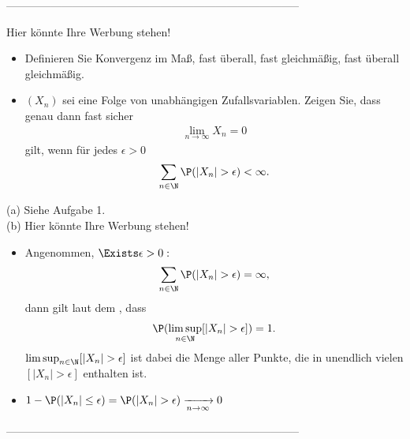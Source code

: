 --------------------------------------------------------------------------------

\begin{exercise}

Hier könnte Ihre Werbung stehen!

\begin{itemize}
  \item[(a)] Definieren Sie Konvergenz im Maß, fast überall, fast gleichmäßig, fast überall gleichmäßig.
  \item[(b)] $(X_n)$ sei eine Folge von unabhängigen Zufallsvariablen. Zeigen Sie, dass genau dann fast sicher
  \begin{align*}
    \lim_{n \to \infty} X_n = 0
  \end{align*}
  gilt, wenn für jedes $\epsilon > 0$
  \begin{align*}
    \sum_{n \in \N} \P(|X_n| > \epsilon) < \infty.
  \end{align*}
\end{itemize}

\end{exercise}

\begin{solution}

(a) Siehe Aufgabe 1. \\

(b) Hier könnte Ihre Werbung stehen!

\begin{itemize}

  \item[\Quote{$\Rightarrow$}:] Angenommen, $\Exists \epsilon > 0:$
  \begin{align*}
    \sum_{n \in \N} \P(|X_n| > \epsilon) = \infty,
  \end{align*}
  dann gilt laut dem , dass
  \begin{align*}
    \P(\limsup_{n \in \N} [|X_n| > \epsilon]) = 1.
  \end{align*}
  $\limsup_{n \in \N} [|X_n| > \epsilon]$ ist dabei die Menge aller Punkte, die in unendlich vielen $[|X_n| > \epsilon]$ enthalten ist.

  \item[\Quote{$\Leftarrow$}:]
  $1 - \P(|X_n| \leq \epsilon)
  =
  \P(|X_n| > \epsilon)
  \xrightarrow[n \to \infty]{} 0$

\end{itemize}

\end{solution}

--------------------------------------------------------------------------------
